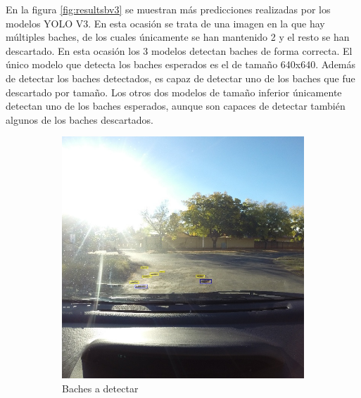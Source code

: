 En la figura \ref{fig:resultsbv3} se muestran más predicciones realizadas por los modelos YOLO V3. En esta ocasión se trata de una imagen en la que hay múltiples baches, de los cuales únicamente se han mantenido 2 y el resto se han descartado. En esta ocasión los 3 modelos detectan baches de forma correcta. El único modelo que detecta los baches esperados es el de tamaño 640x640. Además de detectar los baches detectados, es capaz de detectar uno de los baches que fue descartado por tamaño. Los otros dos modelos de tamaño inferior únicamente detectan uno de los baches esperados, aunque son capaces de detectar también algunos de los baches descartados.

\begin{figure}[H]
	\centering
	\begin{subfigure}[h]{0.45\linewidth}
		\includegraphics[width=\linewidth]{images/results_b_gt.jpg}
		\caption{Baches a detectar}
	\end{subfigure}
	\begin{subfigure}[h]{0.45\linewidth}

\end{subfigure}
\end{figure}
